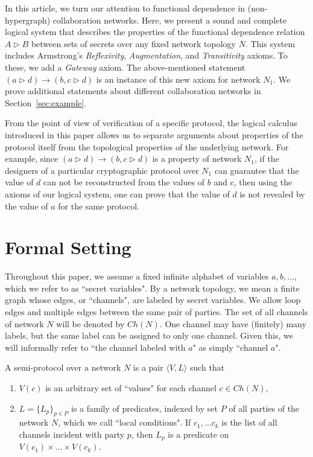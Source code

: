 \documentclass{llncs}
\newcommand{\gateway}{Gateway }
\begin{document}
In this article, we turn our attention to functional dependence in (non-hypergraph) collaboration networks.  Here, we present a sound and complete logical system that describes the properties of the functional dependence relation $A \rhd B$ between sets of secrets over any fixed network topology $N$.  This system includes Armstrong's {\em Reflexivity}, {\em Augmentation}, and {\em Transitivity} axioms.  To these, we add a {\em \gateway} axiom. The above-mentioned statement $(a\rhd d) \rightarrow (b,c\rhd d)$ is an instance of this new axiom for network $N_1$.  We prove additional statements about different collaboration networks in Section~\ref{sec:example}. 

From the point of view of verification of a specific protocol, the logical calculus introduced in this paper allows us to separate arguments about properties of the protocol itself from the topological properties of the underlying network. For example, since $(a\rhd d) \rightarrow (b,c\rhd d)$ is a property of network $N_1$, if the designers of a particular cryptographic protocol over $N_1$ can guarantee that the value of $d$ can not be reconstructed from the values of $b$ and $c$, then using the axioms of our logical system, one can prove that the value of $d$ is not revealed by the value of $a$ for the same protocol.


\section{Formal Setting}

Throughout this paper, we assume a fixed  infinite alphabet of variables $a, b,\dots$, which we refer to as ``secret variables". By a network topology, we mean a finite graph whose edges, or ``channels", are labeled by secret variables.  We allow loop edges and multiple edges between the same pair of parties. The set of all channels of network $N$ will be denoted by $Ch(N)$.  One channel may have (finitely) many labels, but the same label can be assigned to only one channel. Given this, we will informally refer to ``the channel labeled with $a$" as simply ``channel $a$". 

\begin{definition}\label{}
A semi-protocol over a network $N$ is a pair $\langle  V, L\rangle$ such that
\begin{enumerate}
\item $V(c)$ is an arbitrary set of ``values" for each channel $c \in Ch(N)$,
\item $L = \{L_p\}_{p \in P}$ is a family of predicates, indexed by set $P$ of all parties of the network $N$, which we call ``local conditions".  If $c_1,\dots c_k$ is the list of all channels incident with party $p$, then  $L_p$ is a predicate on $V(c_1)\times\dots\times V(c_k)$.
\end{enumerate}
\end{definition}
\end{document}
